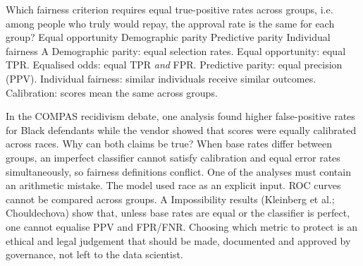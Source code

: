 {Which fairness criterion requires equal true-positive rates across groups, i.e. among people who truly would repay, the approval rate is the same for each group?}
{Equal opportunity}
{Demographic parity}
{Predictive parity}
{Individual fairness}
{A}
{Demographic parity: equal selection rates. Equal opportunity: equal TPR. Equalised odds: equal TPR \emph{and} FPR. Predictive parity: equal precision (PPV). Individual fairness: similar individuals receive similar outcomes. Calibration: scores mean the same across groups.}

{In the COMPAS recidivism debate, one analysis found higher false-positive rates for Black defendants while the vendor showed that scores were equally calibrated across races. Why can both claims be true?}
{When base rates differ between groups, an imperfect classifier cannot satisfy calibration and equal error rates simultaneously, so fairness definitions conflict.}
{One of the analyses must contain an arithmetic mistake.}
{The model used race as an explicit input.}
{ROC curves cannot be compared across groups.}
{A}
{Impossibility results (Kleinberg et al.; Chouldechova) show that, unless base rates are equal or the classifier is perfect, one cannot equalise PPV and FPR/FNR. Choosing which metric to protect is an ethical and legal judgement that should be made, documented and approved by governance, not left to the data scientist.}

